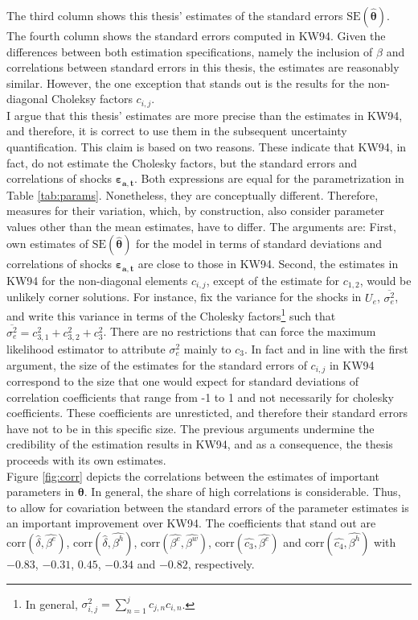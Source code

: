 The third column shows this thesis' estimates of the standard errors $\text{SE}(\pmb{\hat{\theta}})$. The fourth column shows the standard errors computed in KW94. Given the differences between both estimation specifications, namely the inclusion of $\beta$ and correlations between standard errors in this thesis, the estimates are reasonably similar. However, the one exception that stands out is the results for the non-diagonal Choleksy factors $c_{i,j}$.\\
\newline
I argue that this thesis' estimates are more precise than the estimates in KW94, and therefore, it is correct to use them in the subsequent uncertainty quantification. This claim is based on two reasons. These indicate that KW94, in fact, do not estimate the Cholesky factors, but the standard errors and correlations of shocks $\pmb{\varepsilon_{a,t}}$. Both expressions are equal for the parametrization in Table \ref{tab:params}. Nonetheless, they are conceptually different. Therefore, measures for their variation, which, by construction, also consider parameter values other than the mean estimates, have to differ. The arguments are: First, own estimates of $\text{SE}(\pmb{\hat{\theta}})$ for the model in terms of standard deviations and correlations of shocks $\pmb{\varepsilon_{a,t}}$ are close to those in KW94. Second, the estimates in KW94 for the non-diagonal elements $c_{i,j}$, except of the estimate for $c_{1,2}$, would be unlikely corner solutions. For instance, fix the variance for the shocks in $U_e$, $\overline{\sigma_e^2}$, and write this variance in terms of the Cholesky factors\footnote{In general, $\sigma_{i,j}^2 = \sum_{n=1}^{j} c_{j,n}c_{i,n}$.} such that $\overline{\sigma_e^2}=c_{3,1}^2+c_{3,2}^2+c_{3}^2$. There are no restrictions that can force the maximum likelihood estimator to attribute $\sigma_e^2$ mainly to $c_{3}$. In fact and in line with the first argument, the size of the estimates for the standard errors of $c_{i,j}$ in KW94 correspond to the size that one would expect for standard deviations of correlation coefficients that range from -1 to 1 and not necessarily for cholesky coefficients. These coefficients are unresticted, and therefore their standard errors have not to be in this specific size. The previous arguments undermine the credibility of the estimation results in KW94, and as a consequence, the thesis proceeds with its own estimates.\\

\noindent
Figure \ref{fig:corr} depicts the correlations between the estimates of important parameters in $\pmb{\theta}$. In general, the share of high correlations is considerable. Thus, to allow for covariation between the standard errors of the parameter estimates is an important improvement over KW94. The coefficients that stand out are $\text{corr}(\hat{\delta},\hat{\beta^e})$, $\text{corr}(\hat{\delta},\hat{\beta^h})$, $\text{corr}(\hat{\beta^e},\hat{\beta^w})$, $\text{corr}(\hat{c_3},\hat{\beta^e})$ and $\text{corr}(\hat{c_4},\hat{\beta^h})$ with $-0.83$, $-0.31$, $0.45$, $-0.34$ and $-0.82$, respectively. 

